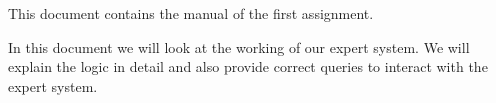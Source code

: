 This document contains the manual of the first assignment.

In this document we will look at the working of our expert system.
We will explain the logic in detail and also provide correct queries to interact with the expert system.
